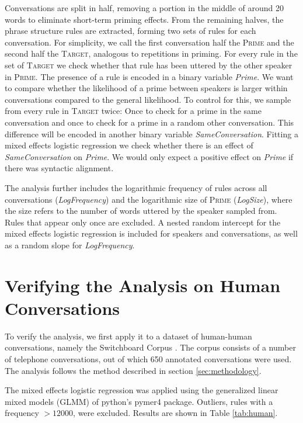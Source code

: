 \documentclass[11pt]{article}
\begin{document}
Conversations are split in half, removing a portion in the middle of around 20 words to eliminate short-term priming effects. From the remaining halves, the phrase structure rules are extracted, forming two sets of rules for each conversation. For simplicity, we call the first conversation half the \textsc{Prime} and the second half the \textsc{Target}, analogous to repetitions in priming. For every rule in the set of \textsc{Target} we check whether that rule has been uttered by the other speaker in \textsc{Prime}. The presence of a rule is encoded in a binary variable \textit{Prime}. We want to compare whether the likelihood of a prime between speakers is larger within conversations compared to the general likelihood. To control for this, we sample from every rule in \textsc{Target} twice: Once to check for a prime in the same conversation and once to check for a prime in a random other conversation. This difference will be encoded in another binary variable \textit{SameConversation}. Fitting a mixed effects logistic regression we check whether there is an effect of \textit{SameConversation} on \textit{Prime}. We would only expect a positive effect on \textit{Prime} if there was syntactic alignment.

The analysis further includes the logarithmic frequency of rules across all conversations (\textit{LogFrequency}) and the logarithmic size of \textsc{Prime} (\textit{LogSize}), where the size refers to the number of words uttered by the speaker sampled from. Rules that appear only once are excluded. A nested random intercept for the mixed effects logistic regression is included for speakers and conversations, as well as a random slope for \textit{LogFrequency}.

\section{Verifying the Analysis on Human Conversations}
To verify the analysis, we first apply it to a dataset of human-human conversations, namely the Switchboard Corpus \cite{marcus1994penn}. The corpus consists of a number of telephone conversations, out of which 650 annotated conversations were used. The analysis follows the method described in section \ref{sec:methodology}.

The mixed effects logistic regression was applied using the generalized linear mixed models (GLMM) of python's pymer4 package. Outliers, rules with a frequency $> 12000$, were excluded. Results are shown in Table \ref{tab:human}.
\end{document}
